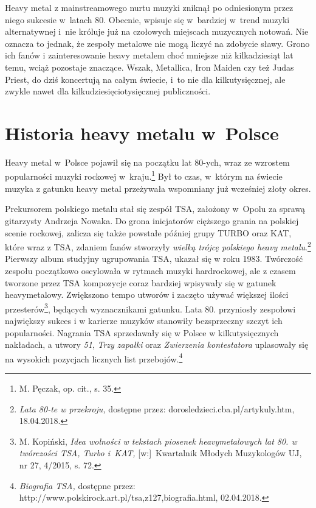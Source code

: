 \documentclass[12pt, a4paper, titlepage]{report}
\begin{document}
Heavy metal z mainstreamowego nurtu muzyki zniknął po odniesionym przez niego sukcesie w~latach 80. Obecnie, wpisuje się w~bardziej w~trend muzyki alternatywnej i~nie króluje już na czołowych miejscach muzycznych notowań. Nie oznacza to jednak, że zespoły metalowe nie mogą liczyć na zdobycie sławy. Grono ich fanów i zainteresowanie heavy metalem choć mniejsze niż kilkadziesiąt lat temu, wciąż pozostaje znaczące. Wszak, Metallica, Iron Maiden czy też Judas Priest, do dziś koncertują na całym świecie, i~to nie dla kilkutysięcznej, ale zwykle nawet dla kilkudziesięciotysięcznej publiczności. 

\section{Historia heavy metalu w~Polsce}
Heavy metal w~Polsce pojawił się na początku lat 80-ych, wraz ze wzrostem popularności muzyki rockowej w~kraju.\footnote{M. Pęczak, op. cit., s. 35.} Był to czas, w~którym na świecie muzyka z gatunku heavy metal przeżywała wspomniany już wcześniej złoty okres. 

Prekursorem polskiego metalu stał się zespół TSA, założony w~Opolu za sprawą gitarzysty Andrzeja Nowaka. Do grona inicjatorów cięższego grania na polskiej scenie rockowej, zalicza się także powstałe później grupy TURBO oraz KAT, które wraz z TSA, zdaniem fanów stworzyły \textit{wielką trójcę polskiego heavy metalu}.\footnote{\textit{Lata 80-te w przekroju,} dostępne przez: dorosledzieci.cba.pl/artykuly.htm, 18.04.2018.} Pierwszy album studyjny ugrupowania TSA, ukazał się w roku 1983. Twórczość zespołu początkowo oscylowała w rytmach muzyki hardrockowej, ale z czasem tworzone przez TSA kompozycje coraz bardziej wpisywały się w gatunek heavymetalowy. Zwiększono tempo utworów i zaczęto używać większej ilości przesterów\footnote{M. Kopiński, \textit{Idea wolności w tekstach piosenek heavymetalowych lat 80. w twórczości TSA, Turbo i~KAT,} [w:]~Kwartalnik Młodych Muzykologów UJ, nr 27, 4/2015, s. 72.}, będących wyznacznikami gatunku. Lata 80. przyniosły zespołowi największy sukces i w karierze muzyków stanowiły bezsprzeczny szczyt ich popularności. Nagrania TSA sprzedawały się w Polsce w kilkutysięcznych nakładach, a utwory \textit{51}, \textit{Trzy zapałki} oraz \textit{Zwierzenia kontestatora} uplasowały się na wysokich pozycjach licznych list przebojów.\footnote{\textit{Biografia TSA,} dostępne przez: http://www.polskirock.art.pl/tsa,z127,biografia.html, 02.04.2018.} 
\end{document}
